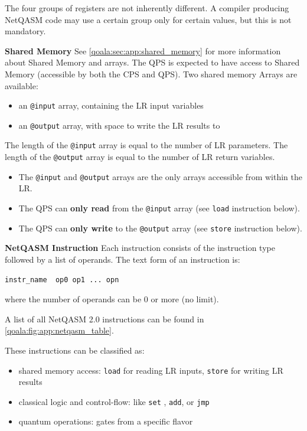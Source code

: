 The four groups of registers are not inherently different. A compiler producing NetQASM code may use a certain group only for certain values, but this is not mandatory.

\textbf{Shared Memory}
See \cref{qoala:sec:app:shared_memory} for more information about Shared Memory and arrays.
The QPS is expected to have access to Shared Memory (accessible by both the CPS and QPS).
Two shared memory Arrays are available:
\begin{itemize}
\item an \texttt{@input} array, containing the LR input variables
\item an \texttt{@output} array, with space to write the LR results to
\end{itemize}

The length of the \texttt{@input} array is equal to the number of LR parameters.
The length of the \texttt{@output} array is equal to the number of LR return variables.

\begin{itemize}
\item The \texttt{@input} and \texttt{@output} arrays are the only arrays accessible from within the LR.
\item The QPS can \textbf{only read} from the \texttt{@input} array (see \texttt{load} instruction below).
\item The QPS can \textbf{only write} to the \texttt{@output} array (see \texttt{store} instruction below).
\end{itemize}

\textbf{NetQASM Instruction}
Each instruction consists of the instruction type followed by a list of operands.
The text form of an instruction is:

\begin{lstlisting}
instr_name  op0 op1 ... opn
\end{lstlisting}

where the number of operands can be 0 or more (no limit).

A list of all NetQASM 2.0 instructions can be found in \cref{qoala:fig:app:netqasm_table}.

These instructions can be classified as:
\begin{itemize}
\item shared memory access: \texttt{load} for reading LR inputs, \texttt{store} for writing LR results
\item classical logic and control-flow: like \texttt{set} , \texttt{add}, or \texttt{jmp}
\item quantum operations: gates from a specific flavor~\cite{dahlberg2022netqasm}
\end{itemize}


